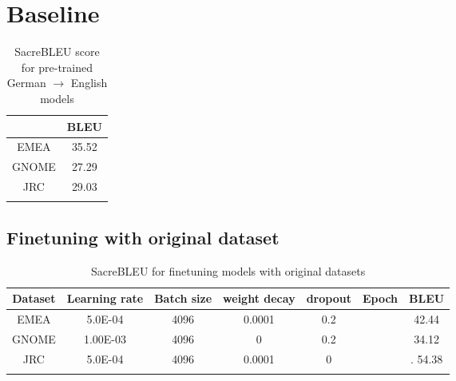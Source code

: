 \section{Baseline}

\begin{table}[h]
\centering
\begin{tabular}{cc}
\Xhline{3\arrayrulewidth}
        &  BLEU  \\\hline
EMEA  &  35.52     \\ 
GNOME  & 27.29       \\
JRC  &   29.03        \\\Xhline{3\arrayrulewidth}

\end{tabular}
\caption{SacreBLEU score for pre-trained German $\rightarrow$ English models}
\label{Tab:NMTresults}
\end{table}

\subsection{Finetuning with original dataset}

\begin{table}[h] 
\centering
\begin{tabular}{ccccccc}
\Xhline{3\arrayrulewidth}
Dataset & Learning rate & Batch size & weight decay  & dropout & Epoch  & BLEU \\\hline
EMEA & 5.0E-04 & 4096 & 0.0001 & 0.2 & &       42.44\\ 
GNOME & 1.00E-03 & 4096 & 0 & 0.2 & &    34.12               \\ 
JRC &5.0E-04 & 4096 & 0.0001 &0  & &. 54.38       \\ \Xhline{3\arrayrulewidth}


\end{tabular}
\caption{SacreBLEU for finetuning models with original datasets}
\label{Tab:BLEU}
\end{table}